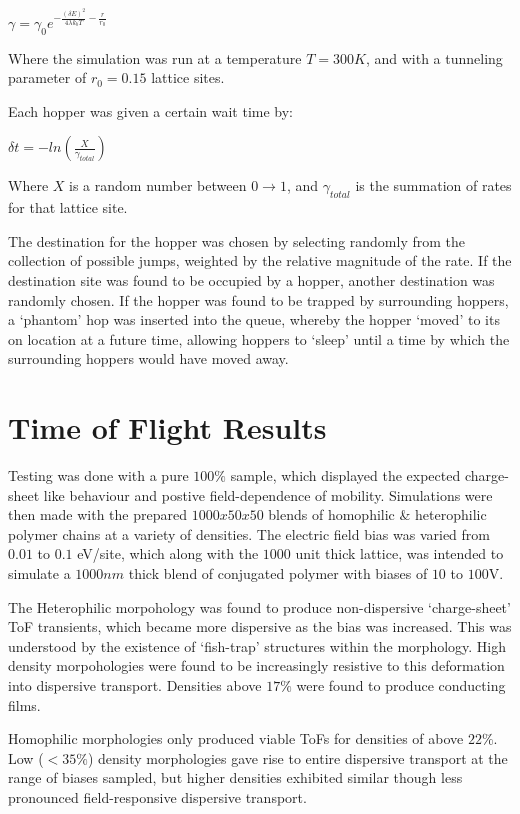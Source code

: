 \documentclass[twocolumn,a4,notitlepage]{article}
\begin{document}
$\gamma = \gamma_0 e^{-  \frac{(\delta E)^2}{4\lambda k_b T} - \frac{r}{r_0}}$

Where the simulation was run at a temperature $T=300K$, and with a tunneling
parameter of $r_0=0.15$ lattice sites.

Each hopper was given a certain wait time by:

$\delta t = - ln(\frac{X}{\gamma_{total}})$

Where $X$ is a random number between $0\rightarrow1$, and $\gamma_{total}$ is the
summation of rates for that lattice site.

The destination for the hopper was chosen by selecting randomly from the
collection of possible jumps, weighted by the relative magnitude of the
rate. If the destination site was found to be occupied by a hopper, another
destination was randomly chosen. If the hopper was found to be trapped by
surrounding hoppers, a `phantom' hop was inserted into the queue, whereby
the hopper `moved' to its on location at a future time, allowing hoppers to
`sleep' until a time by which the surrounding hoppers would have moved away.

\section{Time of Flight Results}

Testing was done with a pure $100\%$ sample, which displayed the expected
charge-sheet like behaviour and postive field-dependence of mobility.
Simulations were then made with the prepared $1000x50x50$ blends of
homophilic \& heterophilic polymer chains at a variety of densities. The
electric field bias was varied from $0.01$ to $0.1$ eV/site, which along
with the $1000$ unit thick lattice, was intended to simulate a $1000nm$
thick blend of conjugated polymer with biases of $10$ to $100$V.

The Heterophilic morpohology was found to produce non-dispersive
`charge-sheet' ToF transients, which became more dispersive as the bias was
increased. This was understood by the existence of `fish-trap' structures
within the morphology. High density morpohologies were found to be
increasingly resistive to this deformation into dispersive transport.
Densities above $17\%$ were found to produce conducting films.

Homophilic morphologies only produced viable ToFs for densities of above
$22\%$. Low ($<35\%$) density morphologies gave rise to entire dispersive
transport at the range of biases sampled, but higher densities exhibited
similar though less pronounced field-responsive dispersive transport.
\end{document}
